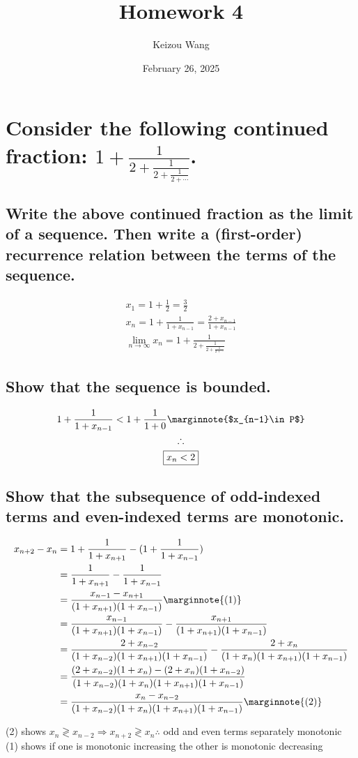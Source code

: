 \documentclass[letterpaper]{article}
\title{Homework 4}
\author{Keizou Wang}
\date{February 26, 2025}
\begin{document}
\maketitle

\section{Consider the following continued fraction: $1+\frac{1}{2+\frac{1}{2+\frac{1}{2+\dotsb}}}$.}
\subsection{Write the above continued fraction as the limit of a sequence. Then write a (first-order) recurrence relation between the terms of the sequence.}
\begin{gather*}
x_1=1+\frac{1}{2}=\frac{3}{2} \\
x_n=1+\frac{1}{1+x_{n-1}}=\frac{2+x_{n-1}}{1+x_{n-1}} \\
\lim_{n\rightarrow\infty}x_n=1+\frac{1}{2+\frac{1}{2+\frac{1}{2+\dotsb}}}
\end{gather*}
\subsection{Show that the sequence is bounded.}
\begin{gather*}
1+\frac{1}{1+x_{n-1}}<1+\frac{1}{1+0} \marginnote{$x_{n-1}\in P$} \\
\therefore \\
\boxed{x_n<2}
\end{gather*}
\subsection{Show that the subsequence of odd-indexed terms and even-indexed terms are monotonic.}
{\allowdisplaybreaks
\begin{align*}
x_{n+2}-x_n&=1+\frac{1}{1+x_{n+1}}-(1+\frac{1}{1+x_{n-1}}) \\
&=\frac{1}{1+x_{n+1}}-\frac{1}{1+x_{n-1}} \\
&=\frac{x_{n-1}-x_{n+1}}{(1+x_{n+1})(1+x_{n-1})} \marginnote{(1)} \\
&=\frac{x_{n-1}}{(1+x_{n+1})(1+x_{n-1})}-\frac{x_{n+1}}{(1+x_{n+1})(1+x_{n-1})} \\
&=\frac{2+x_{n-2}}{(1+x_{n-2})(1+x_{n+1})(1+x_{n-1})}-\frac{2+x_n}{(1+x_n)(1+x_{n+1})(1+x_{n-1})} \\
&=\frac{(2+x_{n-2})(1+x_n)-(2+x_n)(1+x_{n-2})}{(1+x_{n-2})(1+x_n)(1+x_{n+1})(1+x_{n-1})} \\
&=\frac{x_n-x_{n-2}}{(1+x_{n-2})(1+x_n)(1+x_{n+1})(1+x_{n-1})} \marginnote{(2)}
\end{align*}}
\begin{center}
(2) shows $x_n\gtrless x_{n-2}\Rightarrow x_{n+2}\gtrless x_{n}\therefore$ odd and even terms separately monotonic \\
(1) shows if one is monotonic increasing the other is monotonic decreasing
\end{center}
\end{document}

